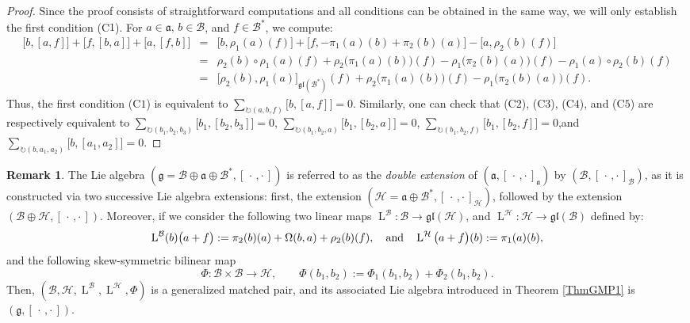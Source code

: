 \documentclass[final,1p,times,nopreprintline]{elsarticle}
\theoremstyle{definition}
\newtheorem{remark}{Remark}[section]
\numberwithin{equation}{section}
\newcommand{\ro}{\circ}
\newcommand{\et}{\quad \textnormal{and}\quad}
\newcommand{\g}{\mathfrak{g}}
\newcommand{\ai}{\mathfrak{a}}
\newcommand{\h}{\mathcal{H}}
\newcommand{\lh}{\operatorname{L}^\h}
\newcommand{\LS}{\operatorname{L}}
\numberwithin{equation}{section}
\newcommand{\gl}{\mathfrak{gl}}
\newcommand{\cro}{[\,\cdot\,,\cdot\,]}
\newcommand{\bi}{\mathcal{B}}
\begin{document}
\begin{proof}
Since the proof consists of straightforward computations and all conditions can be obtained in the same way, we will only establish the first condition (C$1$). For $a\in\ai,\,b\in\bi$, and $f\in\bi^*$, we compute:
\begin{eqnarray*}
\big[b,[a,f]\big]+\big[f,[b,a]\big]+\big[a,[f,b]\big]&=&\Big[b,\rho_1(a)(f)\Big]+\Big[f,-\pi_1(a)(b)+\pi_2(b)(a)\Big]-\Big[a,\rho_2(b)(f)\Big]\\
&=&\rho_2(b)\ro\rho_1(a)(f)+\rho_2\Big(\pi_1(a)(b)\Big)(f)-\rho_1\Big(\pi_2(b)(a)\Big)(f)-\rho_1(a)\ro\rho_2(b)(f)\\
&=&\Big[\rho_2(b),\rho_1(a)\Big]_{\gl(\bi^*)}(f)+\rho_2\Big(\pi_1(a)(b)\Big)(f)-\rho_1\Big(\pi_2(b)(a)\Big)(f).
\end{eqnarray*}
Thus, the first condition (C$1$) is equivalent to $\displaystyle\sum_{\circlearrowright (a,b,f)}\big[b,[a,f]\big]=0$. Similarly, one can check that (C$2$), (C$3$), (C$4$), and (C$5$) are respectively equivalent to $\displaystyle\sum_{\circlearrowright (b_1,b_2,b_3)}\big[b_1,[b_2,b_3]\big]=0$, $\displaystyle\sum_{\circlearrowright (b_1,b_2,a)}\big[b_1,[b_2,a]\big]=0$, $\displaystyle\sum_{\circlearrowright (b_1,b_2,f)}\big[b_1,[b_2,f]\big]=0$,\quad and $\displaystyle\sum_{\circlearrowright (b,a_1,a_2)}\big[b,[a_1,a_2]\big]=0$.
\end{proof}

\begin{remark}
The Lie algebra $(\g=\bi\oplus\ai\oplus\bi^*, \cro)$ is referred to as the \textit{double extension} of $(\ai, \cro_\ai)$ by $(\bi, \cro_\bi)$, as it is constructed via two successive Lie algebra extensions: first, the extension $(\h=\ai\oplus\bi^*, \cro_\h)$, followed by the extension $(\bi \oplus \h, \cro)$. Moreover, if we consider the following two linear maps $\LS^\bi:\bi\to\gl(\h)$, and $\lh:\h\to\gl(\bi)$ defined by:
\begin{equation*}
\LS^\bi(b)\big(a+f\big):=\pi_2(b)(a)+\Omega(b,a)+\rho_2(b)(f),\et\lh\big(a+f\big)(b):=\pi_1(a)(b),
\end{equation*}
and the following skew-symmetric bilinear map
\begin{equation*}
\Phi:\bi\times\bi\to\h,\qquad\Phi(b_1,b_2):=\Phi_1(b_1,b_2)+\Phi_2(b_1,b_2).
\end{equation*}
Then, $(\bi,\h,\LS^\bi,\lh,\Phi)$ is a generalized matched pair, and its associated Lie algebra introduced in Theorem \ref{ThmGMP1} is $(\g,\cro)$.
\end{remark}
\end{document}
